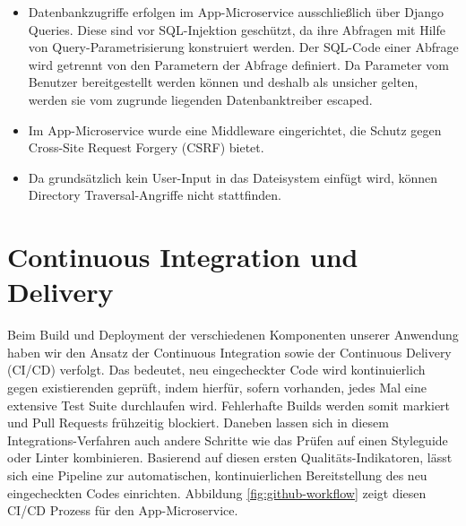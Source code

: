 \documentclass{article}
\begin{document}
\begin{itemize}
    \item Datenbankzugriffe erfolgen im App-Microservice ausschließlich über Django Queries. Diese sind vor SQL-Injektion geschützt, da ihre Abfragen mit Hilfe von Query-Parametrisierung konstruiert werden. Der SQL-Code einer Abfrage wird getrennt von den Parametern der Abfrage definiert. Da Parameter vom Benutzer bereitgestellt werden können und deshalb als unsicher gelten, werden sie vom zugrunde liegenden Datenbanktreiber escaped.~\cite{django-security}
    \item Im App-Microservice wurde eine Middleware eingerichtet, die Schutz gegen Cross-Site Request Forgery (CSRF) bietet.
    \item Da grundsätzlich kein User-Input in das Dateisystem einfügt wird, können Directory Traversal-Angriffe nicht stattfinden.
\end{itemize}




\section{Continuous Integration und Delivery} %

Beim Build und Deployment der verschiedenen Komponenten unserer Anwendung haben wir den Ansatz der Continuous Integration sowie der Continuous Delivery (CI/CD) verfolgt. Das bedeutet, neu eingecheckter Code wird kontinuierlich gegen existierenden geprüft, indem hierfür, sofern vorhanden, jedes Mal eine extensive Test Suite durchlaufen wird. Fehlerhafte Builds werden somit markiert und Pull Requests frühzeitig blockiert. Daneben lassen sich in diesem Integrations-Verfahren auch andere Schritte wie das Prüfen auf einen Styleguide oder Linter kombinieren. Basierend auf diesen ersten Qualitäts-Indikatoren, lässt sich eine Pipeline zur automatischen, kontinuierlichen Bereitstellung des neu eingecheckten Codes einrichten. Abbildung \ref{fig:github-workflow} zeigt diesen CI/CD Prozess für den App-Microservice.
\end{document}
